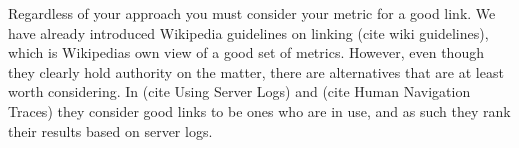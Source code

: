 Regardless of your approach you must consider your metric for a good link. We have already introduced Wikipedia guidelines on linking (cite wiki guidelines), which is Wikipedias own view of a good set of metrics. However, even though they clearly hold authority on the matter, there are alternatives that are at least worth considering. In (cite Using Server Logs) and (cite Human Navigation Traces) they consider good links to be ones who are in use, and as such they rank their results based on server logs.












